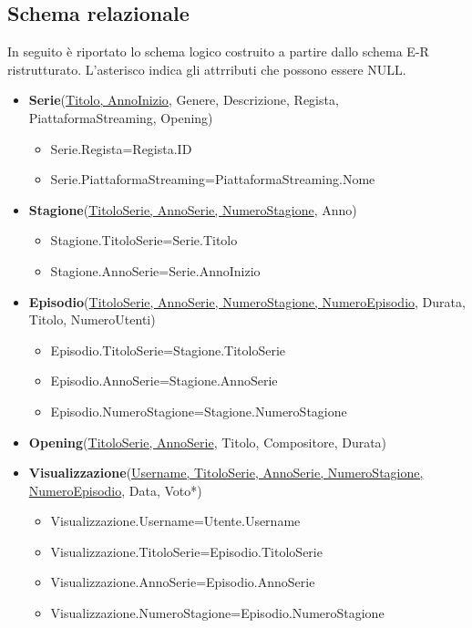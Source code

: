 \documentclass[12pt,a4paper]{article}
\begin{document}
\subsection{Schema relazionale}
In seguito è riportato lo schema logico costruito a partire dallo schema E-R ristrutturato.
L'asterisco indica gli attrributi che possono essere NULL.
\begin{itemize}
    \item \textbf{Serie}(\underline{Titolo, AnnoInizio}, Genere, Descrizione, Regista, PiattaformaStreaming, Opening)
    \begin{itemize}
        \item Serie.Regista=Regista.ID
        \item Serie.PiattaformaStreaming=PiattaformaStreaming.Nome
    \end{itemize}
    \item \textbf{Stagione}(\underline{TitoloSerie, AnnoSerie, NumeroStagione}, Anno)
    \begin{itemize}
        \item Stagione.TitoloSerie=Serie.Titolo
        \item Stagione.AnnoSerie=Serie.AnnoInizio
    \end{itemize}
    \item \textbf{Episodio}(\underline{TitoloSerie, AnnoSerie, NumeroStagione, NumeroEpisodio}, Durata, Titolo, NumeroUtenti)
    \begin{itemize}
        \item Episodio.TitoloSerie=Stagione.TitoloSerie
        \item Episodio.AnnoSerie=Stagione.AnnoSerie
        \item Episodio.NumeroStagione=Stagione.NumeroStagione
    \end{itemize}
    \item \textbf{Opening}(\underline{TitoloSerie, AnnoSerie}, Titolo, Compositore, Durata)
    \item \textbf{Visualizzazione}(\underline{Username, TitoloSerie, AnnoSerie, NumeroStagione, NumeroEpisodio}, Data, Voto*) 
    \begin{itemize}
        \item Visualizzazione.Username=Utente.Username
        \item Visualizzazione.TitoloSerie=Episodio.TitoloSerie
        \item Visualizzazione.AnnoSerie=Episodio.AnnoSerie
        \item Visualizzazione.NumeroStagione=Episodio.NumeroStagione

\end{itemize}
\end{itemize}
\end{document}

